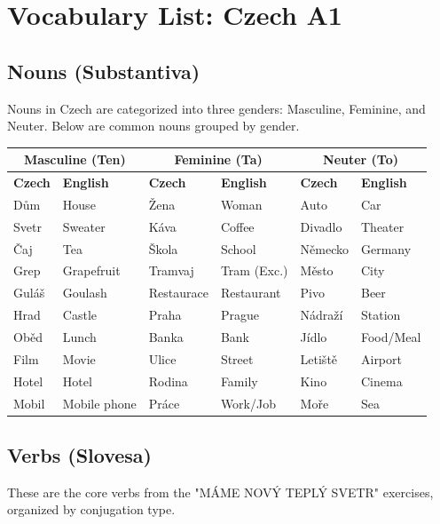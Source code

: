 \section{Vocabulary List: Czech A1}

\subsection{Nouns (Substantiva)}
Nouns in Czech are categorized into three genders: Masculine, Feminine, and Neuter. Below are common nouns grouped by gender.

\begin{center}
\small
\begin{tabular}{ll | ll | ll}
\hline
\multicolumn{2}{c|}{\textbf{Masculine (Ten)}} & \multicolumn{2}{c|}{\textbf{Feminine (Ta)}} & \multicolumn{2}{c}{\textbf{Neuter (To)}} \\ \hline
\textbf{Czech} & \textbf{English} & \textbf{Czech} & \textbf{English} & \textbf{Czech} & \textbf{English} \\ \hline
Dům & House & Žena & Woman & Auto & Car \\
Svetr & Sweater & Káva & Coffee & Divadlo & Theater \\
Čaj & Tea & Škola & School & Německo & Germany \\
Grep & Grapefruit & Tramvaj & Tram (Exc.) & Město & City \\
Guláš & Goulash & Restaurace & Restaurant & Pivo & Beer \\
Hrad & Castle & Praha & Prague & Nádraží & Station \\
Oběd & Lunch & Banka & Bank & Jídlo & Food/Meal \\
Film & Movie & Ulice & Street & Letiště & Airport \\
Hotel & Hotel & Rodina & Family & Kino & Cinema \\
Mobil & Mobile phone & Práce & Work/Job & Moře & Sea \\ \hline
\end{tabular}
\end{center}

\subsection{Verbs (Slovesa)}
These are the core verbs from the "MÁME NOVÝ TEPLÝ SVETR" exercises, organized by conjugation type.


